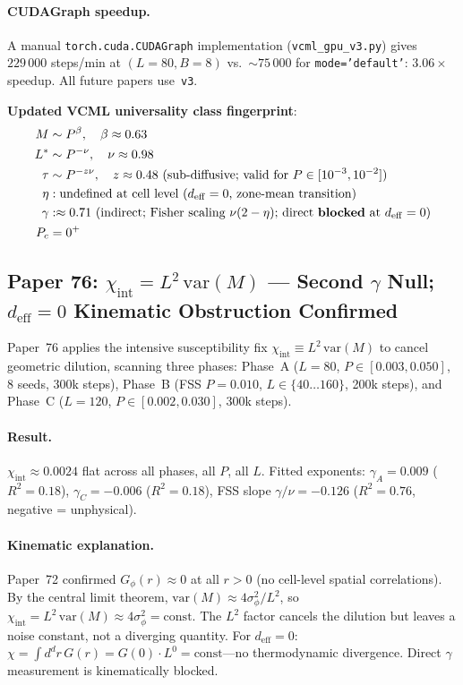 \documentclass[11pt]{article}
\begin{document}
\paragraph{CUDAGraph speedup.}
A manual \texttt{torch.cuda.CUDAGraph} implementation (\texttt{vcml\_gpu\_v3.py}) gives
$229\,000$ steps/min at $(L=80,B=8)$ vs.\ ${\sim}75\,000$ for \texttt{mode='default'}:
$3.06\times$ speedup.  All future papers use~\texttt{v3}.

\textbf{Updated VCML universality class fingerprint}:
\begin{align*}
  M   &\sim P^\beta,\quad\beta\approx0.63 \\
  L^* &\sim P^{-\nu},\quad\nu\approx0.98 \\
  \tau &\sim P^{-z\nu},\quad z\approx0.48\
        (\text{sub-diffusive; valid for }P\in[10^{-3},10^{-2}]) \\
  \eta &: \text{undefined at cell level }(d_\mathrm{eff}=0\text{, zone-mean transition}) \\
  \gamma &: \approx0.71\text{ (indirect; Fisher scaling }\nu(2-\eta)\text{; direct \textbf{blocked} at }d_\mathrm{eff}=0) \\
  P_c &= 0^+
\end{align*}

\subsection*{Paper 76: $\chi_\mathrm{int}=L^2\,\mathrm{var}(M)$ --- Second $\gamma$ Null;
$d_\mathrm{eff}=0$ Kinematic Obstruction Confirmed}

Paper~76 applies the intensive susceptibility fix $\chi_\mathrm{int}\equiv L^2\,\mathrm{var}(M)$
to cancel geometric dilution, scanning three phases:
Phase~A ($L=80$, $P\in[0.003,0.050]$, 8 seeds, 300k steps),
Phase~B (FSS $P=0.010$, $L\in\{40\ldots160\}$, 200k steps),
and Phase~C ($L=120$, $P\in[0.002,0.030]$, 300k steps).

\paragraph{Result.}
$\chi_\mathrm{int}\approx0.0024$ flat across all phases, all $P$, all $L$.
Fitted exponents: $\gamma_A=0.009$ ($R^2=0.18$), $\gamma_C=-0.006$ ($R^2=0.18$),
FSS slope $\gamma/\nu=-0.126$ ($R^2=0.76$, negative = unphysical).

\paragraph{Kinematic explanation.}
Paper~72 confirmed $G_\phi(r)\approx0$ at all $r>0$ (no cell-level spatial correlations).
By the central limit theorem, $\mathrm{var}(M)\approx4\sigma_\phi^2/L^2$, so
$\chi_\mathrm{int}=L^2\,\mathrm{var}(M)\approx4\sigma_\phi^2=\mathrm{const}$.
The $L^2$ factor cancels the dilution but leaves a noise constant, not a
diverging quantity.  For $d_\mathrm{eff}=0$:
$\chi=\int d^dr\,G(r)=G(0)\cdot L^0=\mathrm{const}$---no thermodynamic divergence.
Direct $\gamma$ measurement is kinematically blocked.
\end{document}
